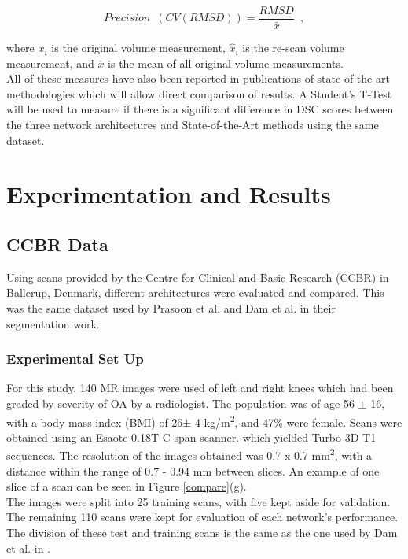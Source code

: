\documentclass[11pt,a4paper]{memoir}
\numberwithin{figure}{section}
\numberwithin{table}{section}
\numberwithin{equation}{section}
\begin{document}
\begin{equation}
Precision \enspace (CV(RMSD)) = \frac{RMSD}{\bar{x}}\enspace,
\label{RMSD CV}
\end{equation}

where $x_{i}$ is the original volume measurement, $\hat{x}_{i}$ is the re-scan volume measurement, and $\bar{x}$ is the mean of all original volume measurements.\\


All of these measures have also been reported in publications of state-of-the-art methodologies which will allow direct comparison of results. A Student's T-Test will be used to measure if there is a significant difference in DSC scores between the three network architectures and State-of-the-Art methods using the same dataset.

\clearpage

\chapter{Experimentation and Results}
\section{CCBR Data}
Using scans provided by the Centre for Clinical and Basic Research (CCBR) in Ballerup, Denmark, different architectures were evaluated and compared. This was the same dataset used by Prasoon et al. \cite{Prasoon2013DeepNetwork} and Dam et al. \cite{Dam2015} in their segmentation work.

\subsection{Experimental Set Up}
For this study, 140 MR images were used of left and right knees which had been graded by severity of OA by a radiologist. The population was of age 56 \(\pm\) 16, with a body mass index (BMI) of 26\(\pm\) 4 kg/m\textsuperscript{2}, and 47\% were female. Scans were obtained using an Esaote 0.18T C-span scanner. which yielded Turbo 3D T1 sequences. The resolution of the images obtained was 0.7 x 0.7 mm\textsuperscript{2}, with a distance within the range of 0.7 - 0.94 mm between slices. An example of one slice of a scan can be seen in Figure \ref{compare}(g). \\ 

The images were split into 25 training scans, with five kept aside for validation. The remaining 110 scans were kept for evaluation of each network's performance. The division of these test and training scans is the same as the one used by Dam et al. in \cite{Dam2015}.\\
\end{document}
